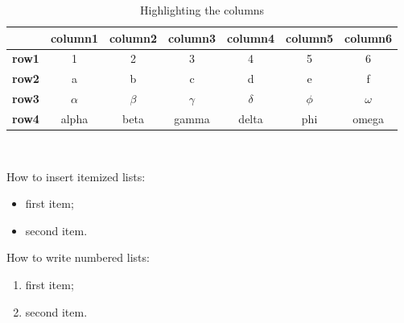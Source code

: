 \documentclass[11pt,a4paper]{article}
\begin{document}
\begin{table}[bp]
\centering 
    \begin{tabular}{|p{3em} | c | c | c | c | c | c|}
    \hline
    \rowcolor{bluePoli!40}
     & \textbf{column1} & \textbf{column2} & \textbf{column3} & \textbf{column4} & \textbf{column5} & \textbf{column6} \T\B \\
    \hline \hline
    \textbf{row1} & 1 & 2 & 3 & 4 & 5 & 6 \T\B\\
    \textbf{row2} & a & b & c & d & e & f \T\B\\
    \textbf{row3} & $\alpha$ & $\beta$ & $\gamma$ & $\delta$ & $\phi$ & $\omega$ \T\B\\
    \textbf{row4} & alpha & beta & gamma & delta & phi & omega \B\\
    \hline
    \end{tabular}
    \\[10pt]
    \caption{Highlighting the columns}
    \label{table:exampleC}
\end{table}

How to insert itemized lists:
\begin{itemize}
    \item first item;
    \item second item.
\end{itemize}

How to write numbered lists:
\begin{enumerate}
    \item first item;
    \item second item.
\end{enumerate}

\end{document}
